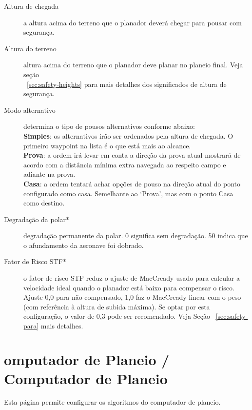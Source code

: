 \begin{description}
\item[Altura de chegada]  a altura acima do terreno que o planador deverá chegar para pousar com segurança.
\item[Altura do terreno]  \label{conf:safetyterrain} altura acima do terreno que o planador deve planar no planeio final.  Veja seção \\
~\ref{sec:safety-heights} para mais detalhes dos significados de altura de segurança. \\
\item[Modo alternativo]  \label{conf:alternatesmode} determina o tipo de pousos alternativos conforme abaixo: \\
  {\bf Simples}: os alternativos irão ser ordenados pela altura de chegada.  O primeiro waypoint na lista é o que está mais ao alcance.   \\
  {\bf Prova}: a ordem irá levar em conta a direção da prova atual mostrará de acordo com a distância mínima extra navegada ao respeito campo e adiante na prova. \\
  {\bf Casa}: a ordem tentará achar opções de pouso na direção atual do ponto configurado como casa.  Semelhante ao ‘Prova’, mas com o ponto Casa como destino.
\item[Degradação da polar*]  degradação permanente da polar. 0 significa sem degradação.  50 indica que o afundamento da aeronave foi dobrado.\label{conf:safetyMC} 
\item[Fator de Risco STF*] 
 o fator de risco STF reduz o ajuste de MacCready usado para calcular a velocidade ideal quando o planador está baixo para compensar o risco.  Ajuste 0,0 para não compensado, 1,0 faz o 
 MacCready linear com o peso (com referência à altura de subida máxima).  Se optar por esta configuração, o valor de 0,3 pode ser recomendado.  Veja Seção ~\ref{sec:safety-para} mais detalhes.
\end{description}


\section{omputador de Planeio / Computador de Planeio}\label{sec:final-glide}\label{conf:final-glide}	

Esta página permite configurar os algoritmos do computador de planeio.

